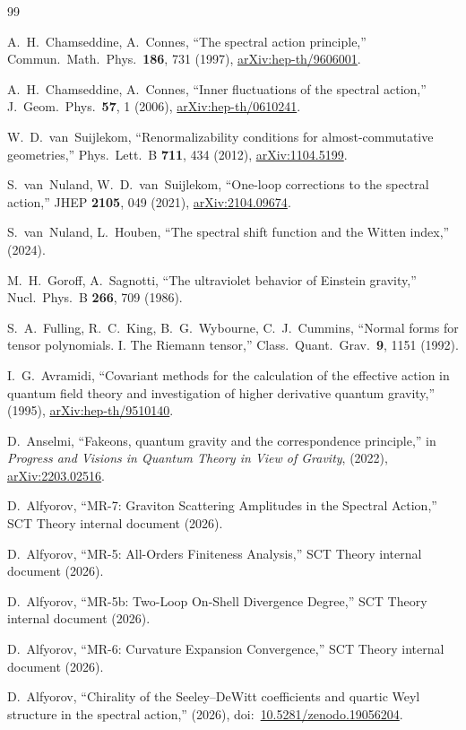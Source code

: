 \documentclass[11pt,a4paper]{article}
\theoremstyle{definition}
\begin{document}
\begin{thebibliography}{99}

A.~H.~Chamseddine, A.~Connes,
``The spectral action principle,''
Commun.\ Math.\ Phys.\ \textbf{186}, 731 (1997),
\href{https://arxiv.org/abs/hep-th/9606001}{arXiv:hep-th/9606001}.

A.~H.~Chamseddine, A.~Connes,
``Inner fluctuations of the spectral action,''
J.\ Geom.\ Phys.\ \textbf{57}, 1 (2006),
\href{https://arxiv.org/abs/hep-th/0610241}{arXiv:hep-th/0610241}.

W.~D.~van~Suijlekom,
``Renormalizability conditions for almost-commutative geometries,''
Phys.\ Lett.\ B \textbf{711}, 434 (2012),
\href{https://arxiv.org/abs/1104.5199}{arXiv:1104.5199}.

S.~van~Nuland, W.~D.~van~Suijlekom,
``One-loop corrections to the spectral action,''
JHEP \textbf{2105}, 049 (2021),
\href{https://arxiv.org/abs/2104.09674}{arXiv:2104.09674}.

S.~van~Nuland, L.~Houben,
``The spectral shift function and the Witten index,''
(2024).

M.~H.~Goroff, A.~Sagnotti,
``The ultraviolet behavior of Einstein gravity,''
Nucl.\ Phys.\ B \textbf{266}, 709 (1986).

S.~A.~Fulling, R.~C.~King, B.~G.~Wybourne, C.~J.~Cummins,
``Normal forms for tensor polynomials. I. The Riemann tensor,''
Class.\ Quant.\ Grav.\ \textbf{9}, 1151 (1992).

I.~G.~Avramidi,
``Covariant methods for the calculation of the effective action in quantum
field theory and investigation of higher derivative quantum gravity,''
(1995),
\href{https://arxiv.org/abs/hep-th/9510140}{arXiv:hep-th/9510140}.

D.~Anselmi,
``Fakeons, quantum gravity and the correspondence principle,''
in \emph{Progress and Visions in Quantum Theory in View of Gravity},
(2022),
\href{https://arxiv.org/abs/2203.02516}{arXiv:2203.02516}.

D.~Alfyorov,
``MR-7: Graviton Scattering Amplitudes in the Spectral Action,''
SCT Theory internal document (2026).

D.~Alfyorov,
``MR-5: All-Orders Finiteness Analysis,''
SCT Theory internal document (2026).

D.~Alfyorov,
``MR-5b: Two-Loop On-Shell Divergence Degree,''
SCT Theory internal document (2026).

D.~Alfyorov,
``MR-6: Curvature Expansion Convergence,''
SCT Theory internal document (2026).

D.~Alfyorov,
``Chirality of the Seeley--DeWitt coefficients and quartic Weyl structure
in the spectral action,''
(2026),
doi:~\href{https://doi.org/10.5281/zenodo.19056204}{10.5281/zenodo.19056204}.

\end{thebibliography}
\end{document}
